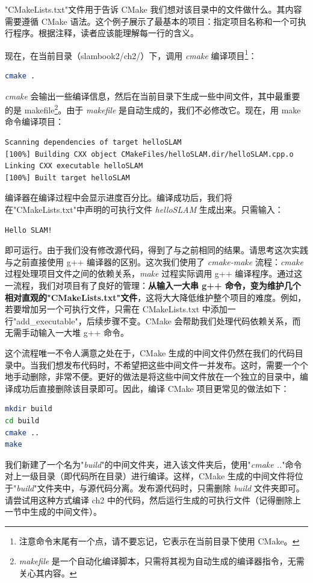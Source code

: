 "CMakeLists.txt"文件用于告诉 CMake 我们想对该目录中的文件做什么。其内容需要遵循 CMake 语法。这个例子展示了最基本的项目：指定项目名称和一个可执行程序。根据注释，读者应该能理解每一行的含义。

现在，在当前目录（slambook2/ch2/）下，调用 \textit{cmake} 编译项目\footnote{注意命令末尾有一个点，请不要忘记，它表示在当前目录下使用 CMake。}：
\begin{lstlisting}[language=sh,caption=终端输入]
cmake .
\end{lstlisting}
\textit{cmake} 会输出一些编译信息，然后在当前目录下生成一些中间文件，其中最重要的是 makefile\footnote{\textit{makefile} 是一个自动化编译脚本，只需将其视为自动生成的编译器指令，无需关心其内容。}。由于 \textit{makefile} 是自动生成的，我们不必修改它。现在，用 make 命令编译项目：
\begin{lstlisting}[language=sh,caption=终端输入]
% make
Scanning dependencies of target helloSLAM
[100%] Building CXX object CMakeFiles/helloSLAM.dir/helloSLAM.cpp.o
Linking CXX executable helloSLAM
[100%] Built target helloSLAM
\end{lstlisting}
编译器在编译过程中会显示进度百分比。编译成功后，我们将在"CMakeLists.txt"中声明的可执行文件 \textit{helloSLAM} 生成出来。只需输入：
\begin{lstlisting}[language=sh,caption=终端输入]
% ./helloSLAM
Hello SLAM!
\end{lstlisting}
即可运行。由于我们没有修改源代码，得到了与之前相同的结果。请思考这次实践与之前直接使用 g++ 编译器的区别。这次我们使用了 \textit{cmake-make} 流程：\textit{cmake} 过程处理项目文件之间的依赖关系，\textit{make} 过程实际调用 g++ 编译程序。通过这一流程，我们对项目有了良好的管理：\textbf{从输入一大串 g++ 命令，变为维护几个相对直观的"CMakeLists.txt"文件}，这将大大降低维护整个项目的难度。例如，若要增加另一个可执行文件，只需在 CMakeLists.txt 中添加一行"add\_executable"，后续步骤不变。CMake 会帮助我们处理代码依赖关系，而无需手动输入一大堆 g++ 命令。

这个流程唯一不令人满意之处在于，CMake 生成的中间文件仍然在我们的代码目录中。当我们想发布代码时，不希望把这些中间文件一并发布。这时，需要一个个地手动删除，非常不便。更好的做法是将这些中间文件放在一个独立的目录中，编译成功后直接删除该目录即可。因此，编译 CMake 项目更常见的做法如下：
\begin{lstlisting}[language=sh,caption=终端输入]
mkdir build
cd build
cmake ..
make
\end{lstlisting}

我们新建了一个名为"\textit{build}"的中间文件夹，进入该文件夹后，使用"\textit{cmake ..}"命令对上一级目录（即代码所在目录）进行编译。这样，CMake 生成的中间文件将位于"\textit{build}"文件夹中，与源代码分离。发布源代码时，只需删除 \textit{build} 文件夹即可。请尝试用这种方式编译 ch2 中的代码，然后运行生成的可执行文件（记得删除上一节中生成的中间文件）。

